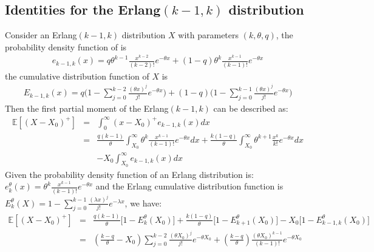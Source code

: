 \documentclass[preprint,12pt]{elsarticle}
\begin{document}
\begin{appendices}
\subsection{Identities for the Erlang$(k-1,k)$ distribution}
\label{appendix:erlongk-1}
Consider an Erlang$(k-1,k)$ distribution $X$ with parameters $(k,\theta,q)$, the probability density function of is
\begin{eqnarray}
e_{k-1,k}(x)=q\theta^{k-1}\frac{x^{k-2}}{(k-2)!}e^{-\theta x} + (1-q)\theta^{k}\frac{x^{k-1}}{(k-1)!}e^{-\theta x} \nonumber
\end{eqnarray}
the cumulative distribution function of $X$ is
\begin{eqnarray}
E_{k-1,k}(x)=q\bigg(1-\sum_{j=0}^{k-2}\frac{(\theta x)^{j}}{j!}e^{-\theta x} \bigg)+(1-q)\bigg(1-\sum_{j=0}^{k-1}\frac{(\theta x)^{j}}{j!}e^{-\theta x} \bigg) \nonumber
\end{eqnarray}
Then the first partial moment of the Erlang$(k-1,k)$ can be described as:
\begin{eqnarray}
\mathbb{E}{[(X-X_{0})^{+}]} &=& \int_{0}^{\infty}{(x-X_{0})^{+}e_{k-1,k}(x)d x} \nonumber\\
&=& \frac{q(k-1)}{\theta}\int_{X_{0}}^{\infty}{\theta^{k}\frac{x^{k-1}}{(k-1)!}e^{-\theta x}dx}+\frac{k(1-q)}{\theta}\int_{X_0}^{\infty}{\theta^{k+1}\frac{x^{k}}{k!}e^{-\theta x}dx}\nonumber\\
&&-X_{0}\int_{X_{0}}^{\infty}{e_{k-1,k}(x)dx}\nonumber
\end{eqnarray}
Given the probability density function of an Erlang distribution is: $e_{k}^{\theta}(x)=\theta^{k}\frac{x^{k-1}}{(k-1)!}e^{-\theta x}$ and the Erlang cumulative distribution function is $E_{k}^{\theta}(X) = 1-\sum_{j=0}^{k-1}{\frac{(\lambda x)^{j}}{j!}e^{-\lambda x}}$, we have:
\begin{eqnarray}
\mathbb{E}{[(X-X_{0})^{+}]}
&=& \frac{q(k-1)}{\theta}\bigg[1-E_{k}^{\theta}(X_{0})\bigg]+\frac{k(1-q)}{\theta}\bigg[1-E_{k+1}^{\theta}(X_{0})\bigg]-X_{0}\bigg[1-E_{k-1,k}^{\theta}(X_{0})\bigg] \nonumber\\
&=&(\frac{k-q}{\theta}-X_{0})\sum_{j=0}^{k-2}{\frac{(\theta X_{0})^j}{j!}e^{-\theta X_{0}}}+(\frac{k-q}{\theta})\frac{(\theta X_{0})^{k-1}}{(k-1)!}e^{-\theta X_{0}}\nonumber
\end{eqnarray}



\end{appendices}
\end{document}
